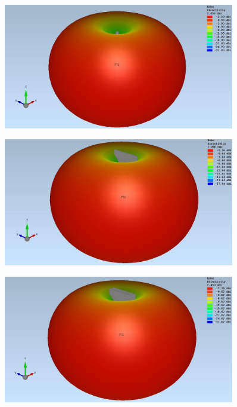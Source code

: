 \begin{figure}[h]
	\begin{center}
		\includegraphics[width=0.9\textwidth]{content/bilder/Evaluation/Dipol/3D_Dipol_Freiraum.JPG}
		\label{fig:sim_Dipol_Freiraum_3D}
	\end{center}
\end{figure}
\begin{figure}
	\begin{center}
		\includegraphics[width=0.9\textwidth]{content/bilder/Evaluation/Dipol/3D_Dipol_ABS.JPG}
		\label{fig:sim_Dipol_1ABS_3D}
	\end{center}
\end{figure}
\begin{figure}
	\begin{center}
		\includegraphics[width=0.9\textwidth]{content/bilder/Evaluation/Dipol/3D_Dipol_2ABS.JPG}
		\label{fig:sim_Dipol_2ABS_3D}
	\end{center}
\end{figure}
\clearpage


